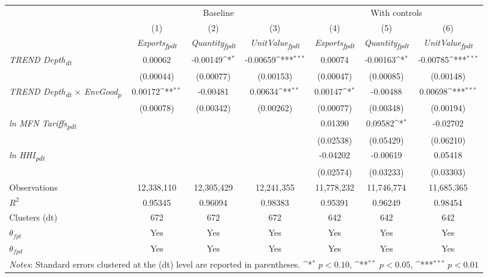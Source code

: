 {
\def\sym#1{\ifmmode^{#1}\else\(^{#1}\)\fi}
\begin{tabular}{l*{6}{c}}
\toprule
&\multicolumn{3}{c}{Baseline}&\multicolumn{3}{c}{With controls}\\\cmidrule(lr){2-4}\cmidrule(lr){5-7}
&(1)&(2)&(3)&(4)&(5)&(6)\\
&\textit{Exports\textsubscript{fpdt}}&\textit{Quantity\textsubscript{fpdt}}&\textit{UnitValue\textsubscript{fpdt}}&\textit{Exports\textsubscript{fpdt}}&\textit{Quantity\textsubscript{fpdt}}&\textit{UnitValue\textsubscript{fpdt}}\\
\midrule
\textit{TREND Depth\textsubscript{dt}} & 0.00062 & -0.00149\sym{*} & -0.00659\sym{***} & 0.00074 & -0.00163\sym{*} & -0.00785\sym{***}\\
 & (0.00044) & (0.00077) & (0.00153) & (0.00047) & (0.00085) & (0.00148)\\
\addlinespace
\textit{TREND Depth\textsubscript{dt} $\times$ EnvGood\textsubscript{p}} & 0.00172\sym{**} & -0.00481 & 0.00634\sym{**} & 0.00147\sym{*} & -0.00488 & 0.00698\sym{***}\\
 & (0.00078) & (0.00342) & (0.00262) & (0.00077) & (0.00348) & (0.00194)\\
\addlinespace
\textit{ln MFN Tariffs\textsubscript{pdt}} &  &  &  & 0.01390 & 0.09582\sym{*} & -0.02702\\
 &  &  &  & (0.02538) & (0.05429) & (0.06210)\\
\addlinespace
\textit{ln HHI\textsubscript{pdt}} &  &  &  & -0.04202 & -0.00619 & 0.05418\\
 &  &  &  & (0.02574) & (0.03233) & (0.03303)\\
\midrule
Observations & 12,338,110 & 12,305,429 & 12,241,355 & 11,778,232 & 11,746,774 & 11,685,365\\
$R^{2}$ & 0.95345 & 0.96094 & 0.98383 & 0.95391 & 0.96249 & 0.98454\\
Clusters (dt) & 672 & 672 & 672 & 642 & 642 & 642\\
$\theta_{fpt}$ & Yes & Yes & Yes & Yes & Yes & Yes\\
$\theta_{fpd}$ & Yes & Yes & Yes & Yes & Yes & Yes\\
\bottomrule
\multicolumn{7}{l}{\footnotesize \textit{Notes}: Standard errors clustered at the (dt) level are reported in parentheses. \sym{*} \(p<0.10\), \sym{**} \(p<0.05\), \sym{***} \(p<0.01\)}\\
\end{tabular}
}
